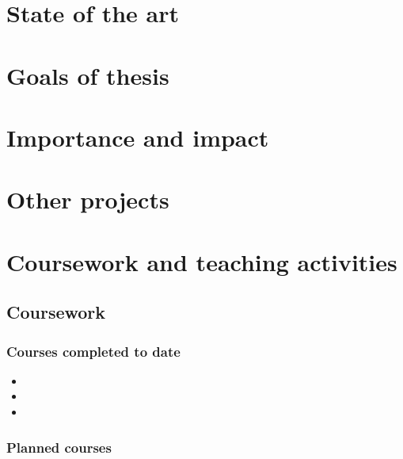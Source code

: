 \documentclass[a4paper,12pt]{article}
\begin{document}
\newpage

\section{State of the art}




\newpage

\section{Goals of thesis}




\newpage

\section{Importance and impact}




\newpage

\section{Other projects}




\newpage

\section{Coursework and teaching activities}


\subsection{Coursework}

\def\labelitemi{--}  %


\subsubsection*{Courses completed to date}

\begin{itemize}
\item
\item
\item
\end{itemize}


\subsubsection*{Planned courses}
\end{document}
